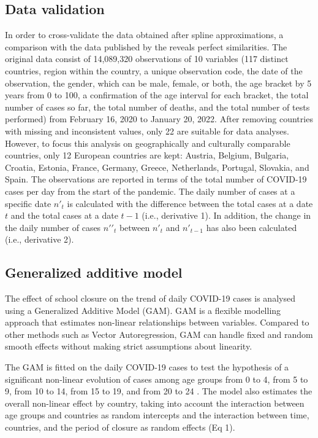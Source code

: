 \documentclass[]{interact}
\theoremstyle{plain}%
\theoremstyle{definition}
\theoremstyle{remark}
\begin{document}
\subsection{Data validation}\label{data-validation}

In order to cross-validate the data obtained after spline approximations, a comparison with the data published by the \citet{who2022https} reveals perfect similarities. The original data consist of 14,089,320 observations of 10 variables (117 distinct countries, region within the country, a unique observation code, the date of the observation, the gender, which can be male, female, or both, the age bracket by 5 years from 0 to 100, a confirmation of the age interval for each bracket, the total number of cases so far, the total number of deaths, and the total number of tests performed) from February 16, 2020 to January 20, 2022. After removing countries with missing and inconsistent values, only 22 are suitable for data analyses. However, to focus this analysis on geographically and culturally comparable countries, only 12 European countries are kept: Austria, Belgium, Bulgaria, Croatia, Estonia, France, Germany, Greece, Netherlands, Portugal, Slovakia, and Spain. The observations are reported in terms of the total number of COVID-19 cases per day from the start of the pandemic. The daily number of cases at a specific date \(n\prime_{t}\) is calculated with the difference between the total cases at a date \(t\) and the total cases at a date \(t-1\) (i.e., derivative 1). In addition, the change in the daily number of cases \(n\prime\prime_{t}\) between \(n\prime_{t}\) and \(n\prime_{t-1}\) has also been calculated (i.e., derivative 2).

\subsection{Generalized additive model}\label{generalized-additive-model}

The effect of school closure on the trend of daily COVID-19 cases is analysed using a Generalized Additive Model (GAM). GAM is a flexible modelling approach that estimates non-linear relationships between variables. Compared to other methods such as Vector Autoregression, GAM can handle fixed and random smooth effects without making strict assumptions about linearity.

The GAM is fitted on the daily COVID-19 cases to test the hypothesis of a significant non-linear evolution of cases among age groups from 0 to 4, from 5 to 9, from 10 to 14, from 15 to 19, and from 20 to 24 \citep{wood2017generalized}. The model also estimates the overall non-linear effect by country, taking into account the interaction between age groups and countries as random intercepts and the interaction between time, countries, and the period of closure as random effects (Eq 1).
\end{document}
